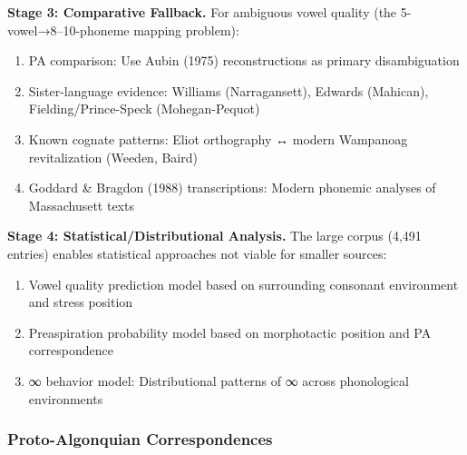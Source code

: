 \textbf{Stage 3: Comparative Fallback.} For ambiguous vowel quality (the
5-vowel→8--10-phoneme mapping problem):
\begin{enumerate}
  \item PA comparison: Use Aubin (1975) reconstructions as primary
    disambiguation
  \item Sister-language evidence: Williams (Narragansett), Edwards (Mahican),
    Fielding/Prince-Speck (Mohegan-Pequot)
  \item Known cognate patterns: Eliot orthography ↔ modern Wampanoag
    revitalization (Weeden, Baird)
  \item Goddard \& Bragdon (1988) transcriptions: Modern phonemic analyses of
    Massachusett texts
\end{enumerate}

\textbf{Stage 4: Statistical/Distributional Analysis.} The large corpus (4,491
entries) enables statistical approaches not viable for smaller sources:
\begin{enumerate}
  \item Vowel quality prediction model based on surrounding consonant
    environment and stress position
  \item Preaspiration probability model based on morphotactic position and PA
    correspondence
  \item ∞ behavior model: Distributional patterns of ∞ across phonological
    environments
\end{enumerate}

\subsubsection{Proto-Algonquian Correspondences}

